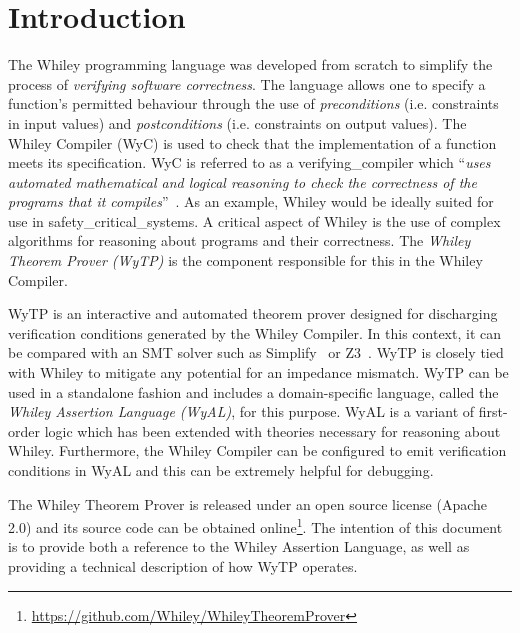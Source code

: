 \chapter{Introduction}

The Whiley programming language was developed from scratch to simplify
the process of {\em verifying software correctness}.  The language
allows one to specify a function's permitted behaviour through the use
of {\em preconditions} (i.e. constraints in input values) and {\em
  postconditions} (i.e. constraints on output values).  The Whiley
Compiler (WyC) is used to check that the implementation of a function
meets its specification.  WyC is referred to as a
\gls{verifying_compiler} which ``{\em uses automated mathematical and
  logical reasoning to check the correctness of the programs that it
  compiles}''~\cite{Hoare03}.  As an example, Whiley would be ideally
suited for use in \gls{safety_critical_system}s.  A critical aspect of
Whiley is the use of complex algorithms for reasoning about programs
and their correctness.  The {\em Whiley Theorem Prover (WyTP)} is the
component responsible for this in the Whiley Compiler.

WyTP is an interactive and automated theorem prover designed for
discharging verification conditions generated by the Whiley Compiler.
In this context, it can be compared with an SMT solver such as
Simplify~\cite{DNS05} or Z3~\cite{MB08}.  WyTP is closely tied with
Whiley to mitigate any potential for an impedance mismatch.  WyTP can
be used in a standalone fashion and includes a domain-specific
language, called the {\em Whiley Assertion Language (WyAL)}, for this
purpose.  WyAL is a variant of first-order logic which has been
extended with theories necessary for reasoning about Whiley.
Furthermore, the Whiley Compiler can be configured to emit
verification conditions in WyAL and this can be extremely helpful for
debugging.

The Whiley Theorem Prover is released under an open source license
(Apache 2.0) and its source code can be obtained
online\footnote{\url{https://github.com/Whiley/WhileyTheoremProver}}.
The intention of this document is to provide both a reference to the
Whiley Assertion Language, as well as providing a technical description
of how WyTP operates.

